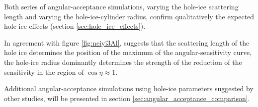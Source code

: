 Both series of angular-acceptance simulations, varying the hole-ice scattering length and varying the hole-ice-cylinder radius, confirm qualitatively the expected hole-ice effects (section \ref{sec:hole_ice_effects}).

In agreement with figure \ref{fig:neiyi3Al}, \rongen \cite{pocam} suggests
that the scattering length of the hole ice determines the position of the maximum of the angular-sensitivity curve, the hole-ice radius dominantly determines the strength of the reduction of the sensitivity in the region of $\cos \eta \approx 1$.

Additional angular-acceptance simulations using hole-ice parameters suggested by other studies, will be presented in section \ref{sec:angular_acceptance_comparison}.
